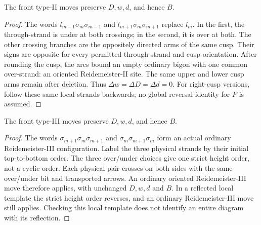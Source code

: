 \begin{lemma}\label{ng:front-II}\leanok
The front type-II moves preserve $D,w,d$, and hence $B$.

\end{lemma}
\begin{proof}\leanok
The words $l_{m-1}\sigma_m\sigma_{m-1}$ and
$l_{m+1}\sigma_m\sigma_{m+1}$ replace $l_m$. In the first, the
through-strand is under at both crossings; in the second, it is over
at both. The other crossing branches are the oppositely directed arms
of the same cusp. Their signs are opposite for every permitted
through-strand and cusp orientation. After rounding the cusp, the arcs
bound an empty ordinary bigon with one common over-strand: an oriented
Reidemeister-II site. The same upper and lower cusp arms remain after
deletion. Thus $\Delta w=\Delta D=\Delta d=0$.
For right-cusp versions, follow these same local strands backwards;
no global reversal identity for $P$ is assumed.
\end{proof}

\begin{lemma}\label{ng:front-III}\leanok
The front type-III moves preserve $D,w,d$, and hence $B$.

\end{lemma}
\begin{proof}\leanok
The words $\sigma_{m+1}\sigma_m\sigma_{m+1}$ and
$\sigma_m\sigma_{m+1}\sigma_m$ form an actual ordinary
Reidemeister-III configuration. Label the three physical strands by
their initial top-to-bottom order. The three over/under choices give
one strict height order, not a cyclic order. Each physical pair crosses
on both sides with the same over/under bit and transported arrows.
An ordinary oriented Reidemeister-III move therefore applies, with
unchanged $D,w,d$ and $B$. In a reflected local template the strict
height order reverses, and an ordinary Reidemeister-III move still
applies. Checking this local template does not identify an entire
diagram with its reflection.
\end{proof}

